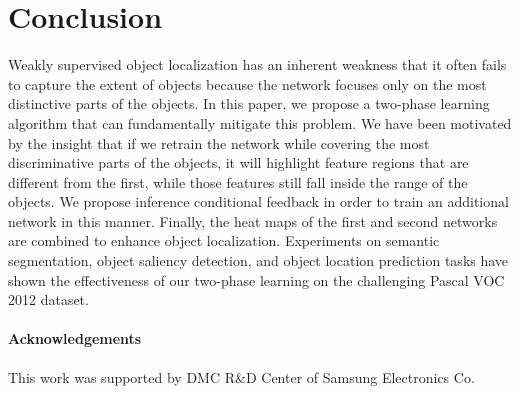 \documentclass[10pt,twocolumn,letterpaper]{article}
\begin{document}
\section{Conclusion}
Weakly supervised object localization has an inherent weakness that it often fails to capture the extent of objects because the network focuses only on the most distinctive parts of the objects. In this paper, we propose a two-phase learning algorithm that can fundamentally mitigate this problem. We have been motivated by the insight that if we retrain the network while covering the most discriminative parts of the objects, it will highlight feature regions that are different from the first, while those features still fall inside the range of the objects. We propose inference conditional feedback in order to train an additional network in this manner. Finally, the heat maps of the first and second networks are combined to enhance object localization. Experiments on semantic segmentation, object saliency detection, and object location prediction tasks have shown the effectiveness of our two-phase learning on the challenging Pascal VOC 2012 dataset.

\paragraph{Acknowledgements}
This work was supported by DMC R\&D Center of Samsung Electronics Co.





\clearpage
\clearpage{\small


}
\end{document}
